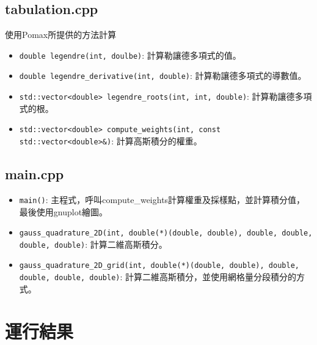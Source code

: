 \documentclass[a4paper,12pt]{article}
\begin{document}
\subsection{tabulation.cpp}
使用Pomax所提供的方法計算\cite{pomax_legendre_gauss}
\begin{itemize}
    \item \texttt{double legendre(int, doulbe)}: 計算勒讓德多項式的值。
    \item \texttt{double legendre\_derivative(int, double)}: 計算勒讓德多項式的導數值。
    \item \texttt{std::vector<double> legendre\_roots(int, int, double)}: 計算勒讓德多項式的根。
    \item \texttt{std::vector<double> compute\_weights(int, const std::vector<double>&)}: 計算高斯積分的權重。 
\end{itemize}

\subsection{main.cpp}
\begin{itemize}
    \item \texttt{main()}: 主程式，呼叫compute\_weights計算權重及採樣點，並計算積分值，最後使用gnuplot繪圖。
    \item \texttt{gauss\_quadrature\_2D(int, double(*)(double, double), double, double, double, double)}: 計算二維高斯積分。
    \item \texttt{gauss\_quadrature\_2D\_grid(int, double(*)(double, double), double, double, double, double)}: 計算二維高斯積分，並使用網格量分段積分的方式。
\end{itemize}


\section{運行結果}
\end{document}
